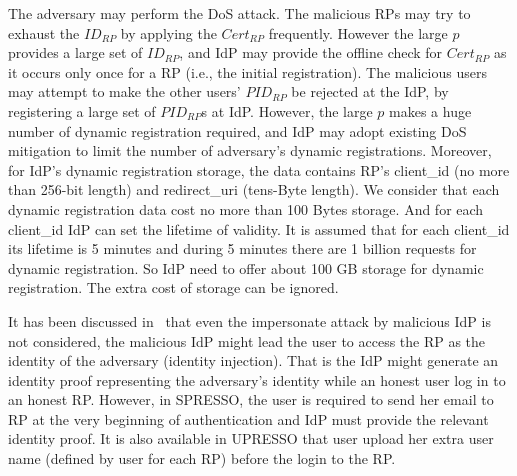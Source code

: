  The adversary may perform the DoS attack. The malicious RPs may try to exhaust the $ID_{RP}$  by applying the $Cert_{RP}$ frequently. However the large $p$ provides a large set of $ID_{RP}$, and IdP may provide the offline check for $Cert_{RP}$ as it occurs only once for a RP (i.e., the initial registration). The malicious users may attempt to make the other users' $PID_{RP}$ be rejected at the IdP, by registering a large set of $PID_{RP}$s at IdP. However, the large $p$ makes a huge number of dynamic registration required, and IdP may adopt existing DoS mitigation to limit the number of adversary's dynamic registrations. Moreover, for IdP's dynamic registration storage, the data contains RP's client\_id (no more than 256-bit length) and redirect\_uri (tens-Byte length). We consider that each dynamic registration data cost no more than 100 Bytes storage. And for each client\_id IdP can set the lifetime of validity. It is assumed that for each client\_id its lifetime is 5 minutes and during 5 minutes there are 1 billion requests for dynamic registration. So IdP need to offer about 100 GB storage for dynamic registration. The extra cost of storage can be ignored.

 It has been discussed in~\cite{SPRESSO} that even the impersonate attack by malicious IdP is not considered, the malicious IdP might lead the user to access the RP as the identity of the adversary (identity injection). That is the IdP might generate an identity proof representing the adversary's identity while an honest user log in to an honest RP. However, in SPRESSO, the user is required to send her email to RP at the very beginning of authentication and IdP must provide the relevant identity proof. It is also available in UPRESSO that user upload her extra user name (defined by user for each RP) before the login to the RP.



